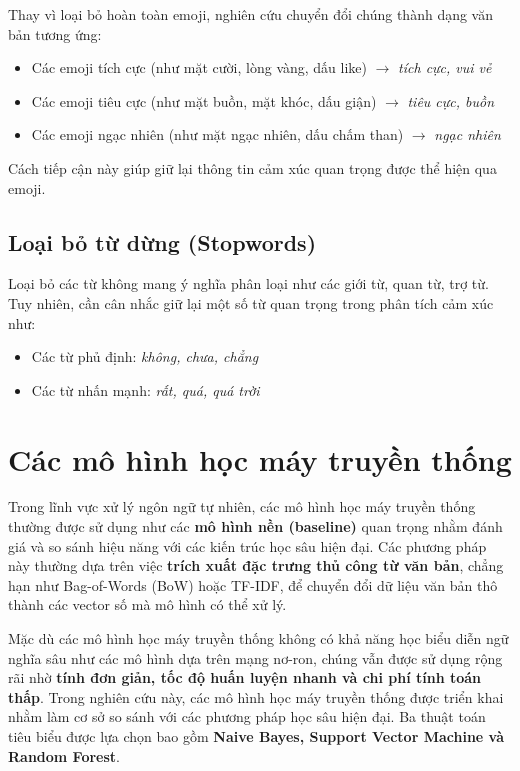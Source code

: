 \documentclass[14pt, a4paper]{report}
\begin{document}
Thay vì loại bỏ hoàn toàn emoji, nghiên cứu chuyển đổi chúng thành dạng văn bản tương ứng:

\begin{itemize}
    \item Các emoji tích cực (như mặt cười, lòng vàng, dấu like) $\rightarrow$ \textit{tích cực, vui vẻ}
    \item Các emoji tiêu cực (như mặt buồn, mặt khóc, dấu giận) $\rightarrow$ \textit{tiêu cực, buồn}
    \item Các emoji ngạc nhiên (như mặt ngạc nhiên, dấu chấm than) $\rightarrow$ \textit{ngạc nhiên}
\end{itemize}

Cách tiếp cận này giúp giữ lại thông tin cảm xúc quan trọng được thể hiện qua emoji.

\subsection{Loại bỏ từ dừng (Stopwords)}

Loại bỏ các từ không mang ý nghĩa phân loại như các giới từ, quan từ, trợ từ. Tuy nhiên, cần cân nhắc giữ lại một số từ quan trọng trong phân tích cảm xúc như:

\begin{itemize}
    \item Các từ phủ định: \textit{không, chưa, chẳng}
    \item Các từ nhấn mạnh: \textit{rất, quá, quá trời}
\end{itemize}

\section{Các mô hình học máy truyền thống}

Trong lĩnh vực xử lý ngôn ngữ tự nhiên, các mô hình học máy truyền thống thường được sử dụng như các \textbf{mô hình nền (baseline)} quan trọng nhằm đánh giá và so sánh hiệu năng với các kiến trúc học sâu hiện đại. Các phương pháp này thường dựa trên việc \textbf{trích xuất đặc trưng thủ công từ văn bản}, chẳng hạn như Bag-of-Words (BoW) hoặc TF-IDF, để chuyển đổi dữ liệu văn bản thô thành các vector số mà mô hình có thể xử lý.

Mặc dù các mô hình học máy truyền thống không có khả năng học biểu diễn ngữ nghĩa sâu như các mô hình dựa trên mạng nơ-ron, chúng vẫn được sử dụng rộng rãi nhờ \textbf{tính đơn giản, tốc độ huấn luyện nhanh và chi phí tính toán thấp}. Trong nghiên cứu này, các mô hình học máy truyền thống được triển khai nhằm làm cơ sở so sánh với các phương pháp học sâu hiện đại. Ba thuật toán tiêu biểu được lựa chọn bao gồm \textbf{Naive Bayes, Support Vector Machine và Random Forest}.
\end{document}
